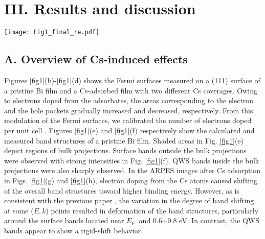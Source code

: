 \documentclass[reprint,secnumarabic,amssymb, nobibnotes, aps, prl,superscriptaddress,showpacs]{revtex4-1}
\def\gmb{${\bar{\Gamma}}{\bar{\mathrm{M}}}$\ }
\def\gkb{${\bar{\Gamma}}{\bar{\mathrm{K}}}$\ }
\def\EF{$E_{\mathrm{F}}$\ }
\begin{document}
\section{III. Results and discussion}

\begin{figure*}
\texttt{[image: Fig1\_final\_re.pdf]}
\caption{\label{fig1}(a) Auger electron spectra with increasing Cs coverage. Cs coverage is expressed as the number of electrons doped per unit cell, as calibrated from the change of Fermi surface areas. (b)-(d) Fermi surfaces extracted with an energy window of 0.01 eV on a pristine Bi(111) film and Cs-adsorbed films with two different coverages. Schematics of the samples and two high-symmetry directions are illustrated. (e) Band structures calculated along \gmb and \gkb directions on a pristine Bi slab. Shaded areas depict bulk projections. (f)-(h) Band structures measured along \gmb and \gkb directions on a Bi film with Cs coverages corresponding to those in (b)-(d).}
\end{figure*}

\subsection{A. Overview of Cs-induced effects}
Figures \ref{fig1}(b)-\ref{fig1}(d) shows the Fermi surfaces measured on a (111) surface of a pristine Bi film and a Cs-adsorbed film with two different Cs coverages. Owing to electrons doped from the adsorbates, the areas corresponding to the electron and the hole pockets gradually increased and decreased, respectively. From this modulation of the Fermi surfaces, we calibrated the number of electrons doped per unit cell \cite{crain2005}. Figures \ref{fig1}(e) and \ref{fig1}(f) respectively show the calculated and measured band structures of a pristine Bi film. Shaded areas in Fig. \ref{fig1}(e) depict regions of bulk projections. Surface bands outside the bulk projections were observed with strong intensities in Fig. \ref{fig1}(f). QWS bands inside the bulk projections were also sharply observed. In the ARPES images after Cs adsorption in Figs. \ref{fig1}(g) and \ref{fig1}(h), electron doping from the Cs atoms caused shifting of the overall band structures toward higher binding energy. However, as is consistent with the previous paper \cite{matetskiy2017}, the variation in the degree of band shifting at some ($E, k$) points resulted in deformation of the band structures, particularly around the surface bands located near \EF and 0.6$\sim$0.8 eV. In contrast, the QWS bands appear to show a rigid-shift behavior.
\end{document}
